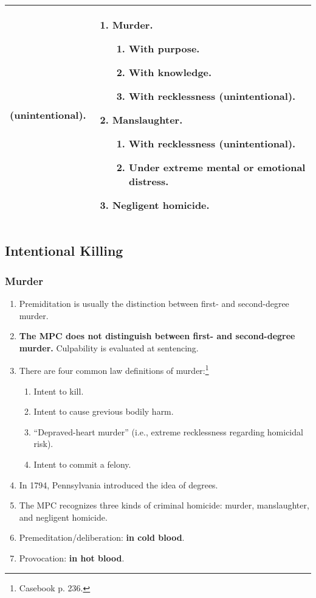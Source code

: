 \begin{tabular}{ | p{5.5cm} | p{5.5cm} |}
\begin{enumerate}
\begin{enumerate}
        (unintentional).
    \end{enumerate}
\end{enumerate}
&
\begin{enumerate}
    \item \textbf{Murder.}
    \begin{enumerate}
        \item With purpose.
        \item With knowledge.
        \item With recklessness (unintentional).
    \end{enumerate}
    \item \textbf{Manslaughter.}
    \begin{enumerate}
        \item With recklessness (unintentional).
        \item Under extreme mental or emotional distress.
    \end{enumerate}
    \item \textbf{Negligent homicide.}
\end{enumerate}
\\ 
\hline
\end{tabular}

\subsection{Intentional Killing}

\subsubsection{Murder}

\begin{enumerate}
    \item Premiditation is usually the distinction between first- and 
    second-degree murder.
    \item \textbf{The MPC does not distinguish between first- and 
    second-degree murder.} Culpability is evaluated at sentencing.
    \item There are four common law definitions of murder:\footnote{Casebook 
    p. 236.}
    \begin{enumerate}
        \item Intent to kill.
        \item Intent to cause grevious bodily harm.
        \item ``Depraved-heart murder'' (i.e., extreme recklessness regarding 
        homicidal risk).
        \item Intent to commit a felony.
    \end{enumerate}
    \item In 1794, Pennsylvania introduced the idea of degrees.
    \item The MPC recognizes three kinds of criminal homicide: murder, 
    manslaughter, and negligent homicide.
    \item Premeditation/deliberation: \textbf{in cold blood}.
    \item Provocation: \textbf{in hot blood}.
\end{enumerate}

